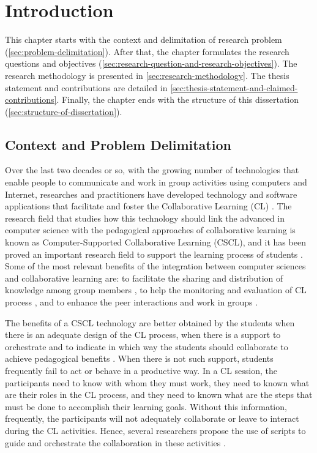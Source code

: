 \chapter{Introduction}
\label{chapter:introducao}

This chapter starts with the context and delimitation of research problem (\autoref{sec:problem-delimitation}). After that, the chapter formulates the research questions and objectives (\autoref{sec:research-question-and-research-objectives}).
The research methodology is presented in \autoref{sec:research-methodology}.
The thesis statement and contributions are detailed in \autoref{sec:thesis-statement-and-claimed-contributions}. Finally, the chapter ends with the structure of this dissertation (\autoref{sec:structure-of-dissertation}).

\section{Context and Problem Delimitation}
\label{sec:problem-delimitation}

Over the last two decades or so, with the growing number of technologies that enable people to communicate and work in group activities using computers and Internet, researches and practitioners have developed technology and software applications that facilitate and foster the Collaborative Learning (CL) \cite{LehtinenHakkarainenLipponenRahikainenMuukkonen1999}.
The research field that studies how this technology should link the advanced in computer science with the pedagogical approaches of collaborative learning is known as Computer-Supported Collaborative Learning (CSCL), and it has been proved an important research field to support the learning process of students \cite{StahlKoschmannSuthers2006}.
Some of the most relevant benefits of the integration between computer sciences and collaborative learning are: to facilitate the sharing and distribution of knowledge among group members \cite{Lipponen2002,NordinKlobas2010},
to help the monitoring and evaluation of CL process \cite{Rodriguez-TrianaPrietoMartinez-MonesAsensio-PerezDimitriadis2018,CaballeDaradoumisXhafaJuan2011},
and to enhance the peer interactions and work in groups \cite{Wang2014,ZhaoGaoYang2018}.

The benefits of a CSCL technology are better obtained by the students when there is an adequate design of the CL process, when there is a support to orchestrate and to indicate in which way the students should collaborate to achieve pedagogical benefits \cite{Dillenbourg2013, Hewitt2005, IsotaniInabaIkedaMizoguchi2009}.
When there is not such support, students frequently fail to act or behave in a productive way.
In a CL session, the participants need to know with whom they must work,
they need to known what are their roles in the CL process, and
they need to known what are the steps that must be done to accomplish their learning goals.
Without this information, frequently, the participants will not adequately collaborate or leave to interact during the CL activities.
Hence, several researchers propose the use of scripts to guide and orchestrate the collaboration in these activities \cite{AlharbiAthaudaChiong2014}.

